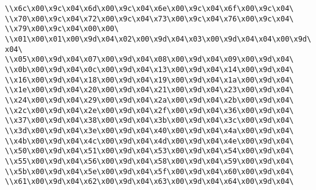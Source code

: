 \verb|\\x6c\x00\x9c\x04\x6d\x00\x9c\x04\x6e\x00\x9c\x04\x6f\x00\x9c\x04\|\newline
\verb|\\x70\x00\x9c\x04\x72\x00\x9c\x04\x73\x00\x9c\x04\x76\x00\x9c\x04\|\newline
\verb|\\x79\x00\x9c\x04\x00\x00\|\newline
\verb|\\x01\x00\x01\x00\x9d\x04\x02\x00\x9d\x04\x03\x00\x9d\x04\x04\x00\x9d\x04\|\newline
\verb|\\x05\x00\x9d\x04\x07\x00\x9d\x04\x08\x00\x9d\x04\x09\x00\x9d\x04\|\newline
\verb|\\x0b\x00\x9d\x04\x0c\x00\x9d\x04\x13\x00\x9d\x04\x14\x00\x9d\x04\|\newline
\verb|\\x16\x00\x9d\x04\x18\x00\x9d\x04\x19\x00\x9d\x04\x1a\x00\x9d\x04\|\newline
\verb|\\x1e\x00\x9d\x04\x20\x00\x9d\x04\x21\x00\x9d\x04\x23\x00\x9d\x04\|\newline
\verb|\\x24\x00\x9d\x04\x29\x00\x9d\x04\x2a\x00\x9d\x04\x2b\x00\x9d\x04\|\newline
\verb|\\x2c\x00\x9d\x04\x2e\x00\x9d\x04\x2f\x00\x9d\x04\x36\x00\x9d\x04\|\newline
\verb|\\x37\x00\x9d\x04\x38\x00\x9d\x04\x3b\x00\x9d\x04\x3c\x00\x9d\x04\|\newline
\verb|\\x3d\x00\x9d\x04\x3e\x00\x9d\x04\x40\x00\x9d\x04\x4a\x00\x9d\x04\|\newline
\verb|\\x4b\x00\x9d\x04\x4c\x00\x9d\x04\x4d\x00\x9d\x04\x4e\x00\x9d\x04\|\newline
\verb|\\x50\x00\x9d\x04\x51\x00\x9d\x04\x53\x00\x9d\x04\x54\x00\x9d\x04\|\newline
\verb|\\x55\x00\x9d\x04\x56\x00\x9d\x04\x58\x00\x9d\x04\x59\x00\x9d\x04\|\newline
\verb|\\x5b\x00\x9d\x04\x5e\x00\x9d\x04\x5f\x00\x9d\x04\x60\x00\x9d\x04\|\newline
\verb|\\x61\x00\x9d\x04\x62\x00\x9d\x04\x63\x00\x9d\x04\x64\x00\x9d\x04\|\newline
